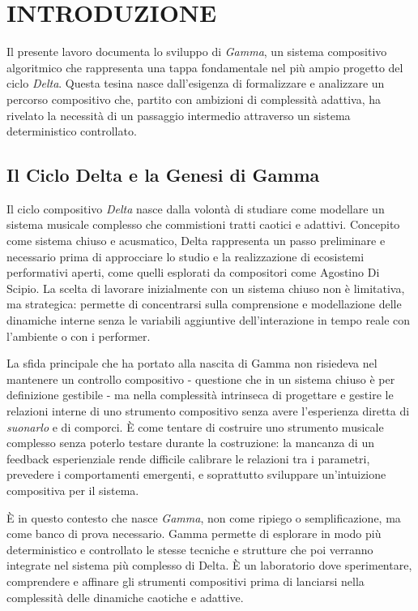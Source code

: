 
\section{INTRODUZIONE}
Il presente lavoro documenta lo sviluppo di \textit{Gamma}, un sistema compositivo algoritmico che rappresenta una tappa fondamentale nel più ampio progetto del ciclo \textit{Delta}. Questa tesina nasce dall'esigenza di formalizzare e analizzare un percorso compositivo che, partito con ambizioni di complessità adattiva, ha rivelato la necessità di un passaggio intermedio attraverso un sistema deterministico controllato.
\subsection{Il Ciclo Delta e la Genesi di Gamma}
Il ciclo compositivo \textit{Delta} nasce dalla volontà di studiare come modellare un sistema musicale complesso che commistioni tratti caotici e adattivi. Concepito come sistema chiuso e acusmatico, Delta rappresenta un passo preliminare e necessario prima di approcciare lo studio e la realizzazione di ecosistemi performativi aperti, come quelli esplorati da compositori come Agostino Di Scipio. La scelta di lavorare inizialmente con un sistema chiuso non è limitativa, ma strategica: permette di concentrarsi sulla comprensione e modellazione delle dinamiche interne senza le variabili aggiuntive dell'interazione in tempo reale con l'ambiente o con i performer.

La sfida principale che ha portato alla nascita di Gamma non risiedeva nel mantenere un controllo compositivo - questione che in un sistema chiuso è per definizione gestibile - ma nella complessità intrinseca di progettare e gestire le relazioni interne di uno strumento compositivo senza avere l'esperienza diretta di \textit{suonarlo} e di comporci. È come tentare di costruire uno strumento musicale complesso senza poterlo testare durante la costruzione: la mancanza di un feedback esperienziale rende difficile calibrare le relazioni tra i parametri, prevedere i comportamenti emergenti, e soprattutto sviluppare un'intuizione compositiva per il sistema.

È in questo contesto che nasce \textit{Gamma}, non come ripiego o semplificazione, ma come banco di prova necessario. Gamma permette di esplorare in modo più deterministico e controllato le stesse tecniche e strutture che poi verranno integrate nel sistema più complesso di Delta. È un laboratorio dove sperimentare, comprendere e affinare gli strumenti compositivi prima di lanciarsi nella complessità delle dinamiche caotiche e adattive.

